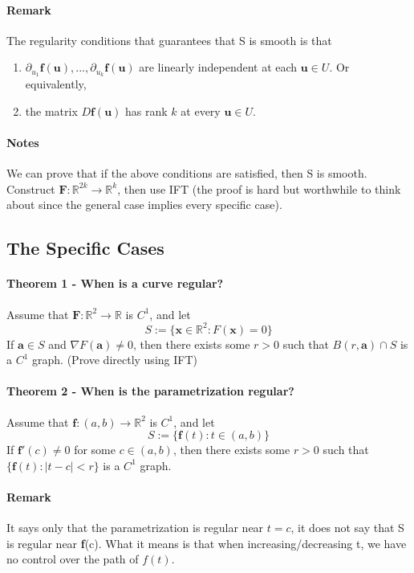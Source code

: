 \documentclass[11pt]{article}
\newcommand{\tb}[1]{\textbf{#1}}
\newcommand{\real}[0]{\mathbb{R}}
\newcommand{\func}[3]{\tb{#1}: {#2} \rightarrow {#3} }
\begin{document}
\paragraph{Remark} The regularity conditions that guarantees that S is smooth is that
\begin{enumerate}
    \item $\partial_{u_1}\tb{f}(\tb{u}),...,\partial_{u_k}\tb{f}(\tb{u})$ are linearly independent at each $\tb{u} \in U$. Or equivalently,
    \item the matrix $D\tb{f}(\tb{u})$ has rank $k$ at every $\tb{u} \in U$.
\end{enumerate}
\paragraph{Notes} We can prove that if the above conditions are satisfied, then S is smooth. Construct $\func{F}{\real^{2k}}{\real^k}$, then use IFT (the proof is hard but worthwhile to think about since the general case implies every specific case).

\subsection{The Specific Cases}
\paragraph{Theorem 1 - When is a curve regular?}
Assume that $\func{F}{\real^2}{\real}$ is $C^1$, and let
$$S:=\{\tb{x} \in \real^2: F(\tb{x}) = 0 \}$$
If $\tb{a} \in S$ and $\nabla F(\tb{a}) \neq 0$, then there exists some $r>0$ such that $B(r, \tb{a}) \cap S$ is a $C^1$ graph. \newline
(Prove directly using IFT)
\paragraph{Theorem 2 - When is the parametrization regular?} 
Assume that $\func{f}{(a, b)}{\real ^2}$ is $C^1$, and let
$$S:=\{ \tb{f}(t): t \in (a, b)\}$$
If $\tb{f}'(c) \neq 0$ for some $c \in (a, b)$, then there exists some $r>0$ such that $\{ \tb{f} (t): |t-c| < r\}$ is a $C^1$ graph. \newline
\paragraph{Remark}
It says only that the parametrization is regular near $t = c$, it does not say that S is regular near \tb{f}(c). What it means is that when increasing/decreasing t, we have no control over the path of $f(t)$.
\end{document}
